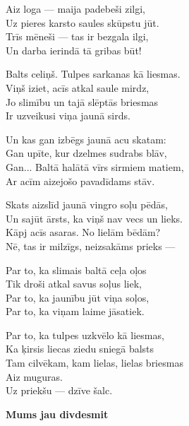 \documentclass[11pt]{article}
\begin{document}
{Aiz loga --- maija padebeši zilgi,\\
Uz pieres karsto saules skūpstu jūt.\\
Trīs mēneši --- tas ir bezgala ilgi,\\
Un darba ierindā tā gribas būt!

Balts celiņš. Tulpes sarkanas kā liesmas.\\
Viņš iziet, acīs atkal saule mirdz,\\
Jo slimību un tajā slēptās briesmas\\
Ir uzveikusi viņa jaunā sirds.

Un kas gan izbēgs jaunā acu skatam:\\
Gan upīte, kur dzelmes sudrabs blāv,\\
Gan... Baltā halātā vīrs sirmiem matiem,\\
Ar acīm aizejošo pavadīdams stāv.

Skats aizslīd jaunā vingro soļu pēdās,\\
Un sajūt ārsts, ka viņš nav vecs un lieks.\\
Kāpj acīs asaras. No lielām bēdām?\\
Nē, tas ir milzīgs, neizsakāms prieks ---

Par to, ka slimais baltā ceļa oļos\\
Tik droši atkal savus soļus liek,\\
Par to, ka jaunību jūt viņa soļos,\\
Par to, ka viņam laime jāsatiek.

Par to, ka tulpes uzkvēlo kā liesmas,\\
Ka ķirsis liecas ziedu sniegā balsts\\
Tam cilvēkam, kam lielas, lielas briesmas\\
Aiz muguras.\\
Uz priekšu --- dzīve šalc.

\newpage
{\bf Mums jau divdesmit}

}
\end{document}
